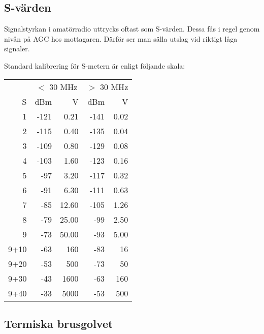 \documentclass[10pt,swedish,a4paper,twoside]{article}
\begin{document}
\subsection{S-värden}

Signalstyrkan i amatörradio uttrycks oftast som S-värden. Dessa fås i regel genom nivån på AGC hos mottagaren. Därför ser man sälla utslag vid riktigt låga signaler.

Standard kalibrering för S-metern är enligt följande skala:

\begin{center}
\begin{tabular}{r|rr|rr}
	     & \multicolumn{2}{c|}{$<$ 30 MHz} & \multicolumn{2}{c}{$>$ 30 MHz} \\
	   S &  dBm &                \textmu V &  dBm &               \textmu V \\ \hline
	   1 & -121 &                     0.21 & -141 &                    0.02 \\
	   2 & -115 &                     0.40 & -135 &                    0.04 \\
	   3 & -109 &                     0.80 & -129 &                    0.08 \\
	   4 & -103 &                     1.60 & -123 &                    0.16 \\
	   5 &  -97 &                     3.20 & -117 &                    0.32 \\
	   6 &  -91 &                     6.30 & -111 &                    0.63 \\
	   7 &  -85 &                    12.60 & -105 &                    1.26 \\
	   8 &  -79 &                    25.00 &  -99 &                    2.50 \\
	   9 &  -73 &                    50.00 &  -93 &                    5.00 \\
	9+10 &  -63 &                      160 &  -83 &                      16 \\
	9+20 &  -53 &                      500 &  -73 &                      50 \\
	9+30 &  -43 &                     1600 &  -63 &                     160 \\
	9+40 &  -33 &                     5000 &  -53 &                     500
\end{tabular}
\end{center}
\subsection{Termiska brusgolvet}
\end{document}
